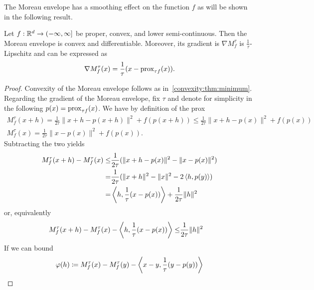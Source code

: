 The Moreau envelope has a smoothing effect on the function $f$ as will be shown in the following result.
\begin{lemma}
    Let $f:\mathbb{R}^d\rightarrow (-\infty,\infty]$ be proper, convex, and lower semi-continuous. Then the Moreau envelope is convex and differentiable. Moreover, its gradient is $\nabla M^\tau_f$ is $\frac{1}{\tau}$-Lipschitz and can be expressed as
    \begin{equation}
        \nabla M^\tau_f(x) = \frac{1}{\tau} (x-\mathrm{prox}_{\tau f}(x)).
    \end{equation}
\end{lemma}
\begin{proof}
    Convexity of the Moreau envelope follows as in~\cref{convexity:thm:minimum}. Regarding the gradient of the Moreau envelope, fix $\tau$ and denote for simplicity in the following $p(x) = \mathrm{prox}_{\tau f}(x)$. We have by definition of the prox
    \begin{equation}
        \begin{aligned}
            M^\tau_f(x+h) = \frac{1}{2\tau}\|x+h-p(x+h)\|^2 + f(p(x+h))
            \leq \frac{1}{2\tau}\|x+h-p(x)\|^2 + f(p(x))\\
            M^\tau_f(x) = \frac{1}{2\tau}\|x-p(x)\|^2 + f(p(x)).
        \end{aligned}
    \end{equation}
    Subtracting the two yields
    \begin{equation}
        \begin{aligned}
            M^\tau_f(x+h) - M^\tau_f(x)
            \leq& \frac{1}{2\tau}(\|x+h-p(x)\|^2 - \|x-p(x)\|^2)\\
            =& \frac{1}{2\tau}(\|x+h\|^2 - \|x\|^2 -2\left\langle h , p(y)\right\rangle)\\
            =& \left\langle h , \frac{1}{\tau}(x-p(x))\right\rangle + \frac{1}{2\tau}\|h\|^2
        \end{aligned}
    \end{equation}
    or, equivalently
    \begin{equation}
        \begin{aligned}
            M^\tau_f(x+h) - M^\tau_f(x) - \left\langle h , \frac{1}{\tau}(x-p(x))\right\rangle
            \leq & \frac{1}{2\tau}\|h\|^2
        \end{aligned}
    \end{equation}
    If we can bound
    \begin{equation}\label{proximal:eq:moreau_diff}
        \phi(h)\coloneqq M^\tau_f(x) - M^\tau_f(y) - \inner{x-y}{\frac{1}{\tau}(y-p(y))}

\end{equation}
\end{proof}

